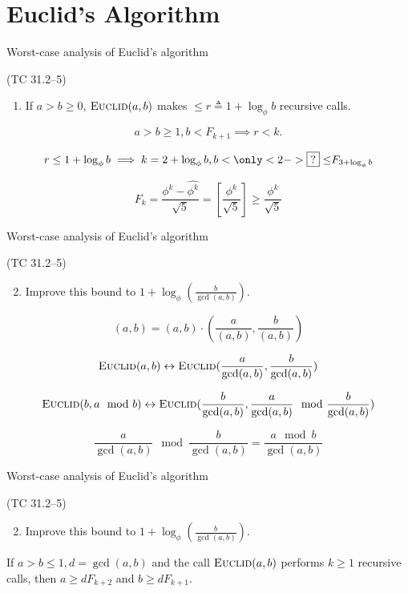 \section{Euclid's Algorithm}

\begin{frame}{Worst-case analysis of Euclid's algorithm}
  \begin{exampleblock}{(TC 31.2--5)}
	\begin{enumerate}
	  \item If $a > b \ge 0$, $\textsc{Euclid}(a,b)$ makes $\le r \triangleq 1 + \log_{\phi}b$ recursive calls.
	\end{enumerate}
  \end{exampleblock}

  \[
	a > b \ge 1, b < F_{k+1} \implies r < k.
  \]

  \[
	r \le 1 + \log_{\phi}b \implies k = 2 + \log_{\phi}b, b < \only<2->{\boxed{?} \le} F_{3 + \log_{\phi}b}
  \]

  \[
	F_k = \frac{\phi^{k} - \hat{\phi^{k}}}{\sqrt{5}} = [\frac{\phi^{k}}{\sqrt{5}}] \ge \frac{\phi^{k}}{\sqrt{5}}
  \]
\end{frame}
\begin{frame}{Worst-case analysis of Euclid's algorithm}
  \begin{exampleblock}{(TC 31.2--5)}
	\begin{enumerate}
	  \setcounter{enumi}{1}
	  \item Improve this bound to $1 + \log_{\phi}(\frac{b}{\gcd(a,b)})$.
	\end{enumerate}
  \end{exampleblock}

  \[
	(a,b) = (a,b) \cdot (\frac{a}{(a,b)}, \frac{b}{(a,b)})
  \]

  \[
	\textsc{Euclid}(a,b) \leftrightarrow \textsc{Euclid}(\frac{a}{\gcd(a,b)}, \frac{b}{\gcd(a,b)})
  \]

  \[
	\textsc{Euclid}(b, a \mod b) \leftrightarrow \textsc{Euclid}(\frac{b}{\gcd(a,b)}, \frac{a}{\gcd(a,b)} \mod \frac{b}{\gcd(a,b)})
  \]

  \[
	\frac{a}{\gcd(a,b)} \mod \frac{b}{\gcd(a,b)} = \frac{a \mod b}{\gcd(a,b)}
  \]
\end{frame}
\begin{frame}{Worst-case analysis of Euclid's algorithm}
  \begin{exampleblock}{(TC 31.2--5)}
	\begin{enumerate}
	  \setcounter{enumi}{1}
	  \item Improve this bound to $1 + \log_{\phi}(\frac{b}{\gcd(a,b)})$.
	\end{enumerate}
  \end{exampleblock}

  \begin{Lemma}
	If $a > b \le 1, d = \gcd(a,b)$ and the call $\textsc{Euclid}(a,b)$ performs $k \ge 1$ recursive calls,
	then $a \ge dF_{k+2}$ and $b \ge dF_{k+1}$.
  \end{Lemma}
\end{frame}
